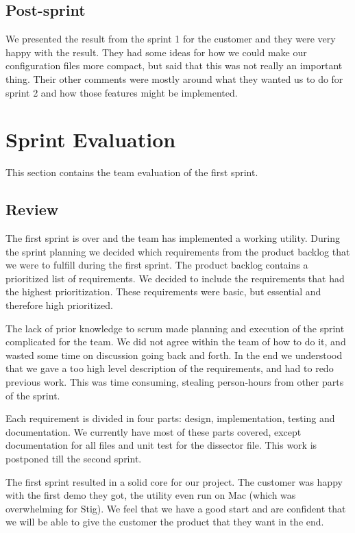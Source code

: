 \subsection{Post-sprint}
We presented the result from the sprint 1 for the customer and they were very happy with the result. They had some ideas for how we could make our configuration files more compact, but said that this was not really an important thing. Their other comments were mostly around what they wanted us to do for sprint 2 and how those features might be implemented.


\section{Sprint Evaluation}
This section contains the team evaluation of the first sprint.

\subsection{Review}
The first sprint is over and the team has implemented a working utility. During the sprint planning we decided which requirements from the product backlog that we were to fulfill during the first sprint. The product backlog contains a prioritized list of requirements. We decided to include the requirements that had the highest prioritization. These requirements were basic, but essential and therefore high prioritized.
   
The lack of prior knowledge to scrum made planning and execution of the sprint complicated for the team. We did not agree within the team of how to do it, and wasted some time on discussion going back and forth. In the end we understood that we gave a too high level description of the requirements, and had to redo previous work. This was time consuming, stealing person-hours from other parts of the sprint.

Each requirement is divided in four parts: design, implementation, testing and documentation. We currently have most of these parts covered, except documentation for all files and unit test for the dissector file. This work is postponed till the second sprint.

The first sprint resulted in a solid core for our project. The customer was happy with the first demo they got, the utility even run on Mac (which was overwhelming for Stig). We feel that we have a good start and are confident that we will be able to give the customer the product that they want in the end.

